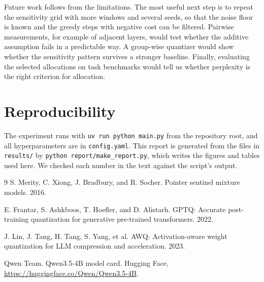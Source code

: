 \documentclass[11pt]{article}
\begin{document}
Future work follows from the limitations. The most useful next step is to repeat the sensitivity grid with more windows and several seeds, so that the noise floor is known and the greedy steps with negative cost can be filtered. Pairwise measurements, for example of adjacent layers, would test whether the additive assumption fails in a predictable way. A group-wise quantizer would show whether the sensitivity pattern survives a stronger baseline. Finally, evaluating the selected allocations on task benchmarks would tell us whether perplexity is the right criterion for allocation.

\section*{Reproducibility}

The experiment runs with \texttt{uv run python main.py} from the repository root, and all hyperparameters are in \texttt{config.yaml}. This report is generated from the files in \texttt{results/} by \texttt{python report/make\_report.py}, which writes the figures and tables used here. We checked each number in the text against the script's output.

\begin{thebibliography}{9}
S. Merity, C. Xiong, J. Bradbury, and R. Socher.
\newblock Pointer sentinel mixture models. 2016.

E. Frantar, S. Ashkboos, T. Hoefler, and D. Alistarh.
\newblock GPTQ: Accurate post-training quantization for generative pre-trained transformers. 2022.

J. Lin, J. Tang, H. Tang, S. Yang, et al.
\newblock AWQ: Activation-aware weight quantization for LLM compression and acceleration. 2023.

Qwen Team.
\newblock Qwen3.5-4B model card. Hugging Face, \url{https://huggingface.co/Qwen/Qwen3.5-4B}.
\end{thebibliography}
\end{document}
